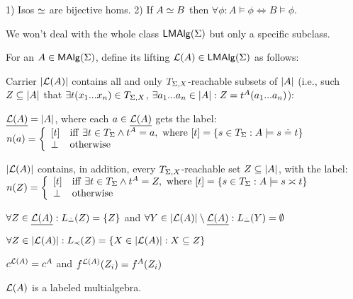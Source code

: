\documentclass[12pt]{article}
\begin{document}
\begin{Claim}
1) Isos $\mathrel{\simeq}$ are bijective homs. 2) If $A\mathrel{\simeq} B$ then
   $\forall\phi: A\models\phi\iff B\models\phi$. 
\end{Claim}
We won't deal
with the whole class ${\sf LMAlg}(\Sigma)$ but only a specific subclass. 
%
\begin{Definition}\label{de:liftA}
For an $A\in{\sf MAlg}(\Sigma)$, define its lifting ${\cal L}(A)\in {\sf LMAlg}(\Sigma)$ as follows:
\begin{enum}
\item Carrier $|{\cal L}(A)|$ contains all and only $T_{\Sigma,X}$-reachable
subsets of $|A|$ (i.e., such $Z\subseteq |A|$ that $\exists
t(x_1...x_n)\in T_{\Sigma,X}$, $\exists a_1...a_n\in|A|:
Z=t^A(a_1...a_n)$):
\begin{enum}
\item\label{a} $\underline {{\cal L}(A)}= |A|$, %
where each $a\in\underline {{\cal L}(A)}$ gets the label:\\
 $n(a) = \left\{\begin{array}{ll} [t] & {\rm iff}\ \exists t\in T_{\Sigma} \land t^A=a,\
 {\rm where}\
[t]=\{s\in T_{\Sigma}: A\models s\mathrel{\dot{=} } t\} \\ \bot & {\rm otherwise}
\end{array}\right.$
\item\label{b} $|{\cal L}(A)|$ contains, in addition, every
$T_{\Sigma,X}$-reachable set  $Z\subseteq |A|$, with the label:\\
 $n(Z) = \left \{ \begin{array}{ll}
 [t] & {\rm iff}\ \exists t\in\GTerms \land t^A=Z,\ {\rm where}\ [t]=\{s\in\GTerms:
 A\models s\seteq t\} \\ \bot & {\rm otherwise}
 \end{array} \right. $ 
\end{enum}
\item\label{Le} $\forall Z\in\underline {{\cal L}(A)}:L_{\mathrel{\dot{=} }}(Z) = \{Z\}$ and $\forall Y
\in |{\cal L}(A)|\setminus \underline {{\cal L}(A)} : L_{\mathrel{\dot{=} }}(Y)=\emptyset$
\item\label{Li} $\forall Z\in|{\cal L}(A)|:L_{\prec}(Z) = \{X\in |{\cal L}(A)|: X
\subseteq Z\}$
\item\label{funcs} $c^{{\cal L}(A)} = c^{A}$ and 
$f^{{\cal L}(A)}(Z_i) = f^A(Z_i)$
\end{enum}
\end{Definition}
\begin{Claim}
${\cal L}(A)$ is a labeled multialgebra.
\end{Claim}
\end{document}
